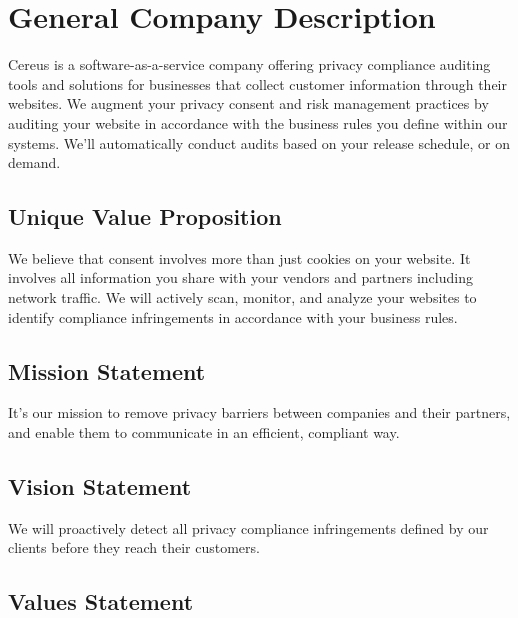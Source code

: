 {\let\cleardoublepage\relax \chapter*{General Company Description}}

Cereus is a software-as-a-service company offering privacy compliance auditing tools and solutions for businesses that collect customer information through their websites. We augment your privacy consent and risk management practices by auditing your website in accordance with the business rules you define within our systems. We'll automatically conduct audits based on your release schedule, or on demand.

\hfill

\section{Unique Value Proposition}

We believe that consent involves more than just cookies on your website. It involves all information you share with your vendors and partners including network traffic. We will actively scan, monitor, and analyze your websites to identify compliance infringements in accordance with your business rules.

\section{Mission Statement}

It's our mission to remove privacy barriers between companies and their partners, and enable them to communicate in an efficient, compliant way.


\section{Vision Statement}

We will proactively detect all privacy compliance infringements defined by our clients before they reach their customers.

\section{Values Statement}

